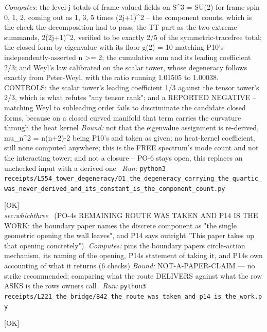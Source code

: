 \begin{description}
\emph{Computes:} the level-j totals of frame-valued fields on S\textasciicircum{}3 = SU(2) for frame-spin 0, 1, 2, coming out as 1, 3, 5 times (2j+1)\textasciicircum{}2 -- the component counts, which is the check the decomposition had to pass; the TT part as the two extreme summands, 2(2j+1)\textasciicircum{}2, verified to be exactly 2/5 of the symmetric-tracefree total; the closed form by eigenvalue with its floor g(2) = 10 matching P10's independently-asserted n >= 2; the cumulative sum and its leading coefficient 2/3; and Weyl's law calibrated on the scalar tower, whose degeneracy follows exactly from Peter-Weyl, with the ratio running 1.01505 to 1.00038. CONTROLS: the scalar tower's leading coefficient 1/3 against the tensor tower's 2/3, which is what refutes "any tensor rank"; and a REPORTED NEGATIVE -- matching Weyl to subleading order fails to discriminate the candidate closed forms, because on a closed curved manifold that term carries the curvature through the heat kernel
 \emph{Bound:} not that the eigenvalue assignment is re-derived, mu\_n\textasciicircum{}2 = n(n+2)-2 being P10's and taken as given; no heat-kernel coefficient, still none computed anywhere; this is the FREE spectrum's mode count and not the interacting tower; and not a closure -- PO-6 stays open, this replaces an unchecked input with a derived one
\ \emph{Run:} \texttt{python3 receipts/L554\_tower\_degeneracy/D1\_the\_degeneracy\_carrying\_the\_quartic\_was\_never\_derived\_and\_its\_constant\_is\_the\_component\_count.py}
\item[\label{rcpt:B42_the_route_was_taken_and_p14_is_the_work}\texttt{B42\_the\_route\_was\_taken\_and\_p14\_is\_the\_work}]\hfill\textsf{[OK]}\\
\textit{sec:whichthree} \ (PO-4s REMAINING ROUTE WAS TAKEN AND P14 IS THE WORK: the boundary paper names the discrete component as "the single geometric opening the wall leaves", and P14 says outright "This paper takes up that opening concretely"). 
\emph{Computes:} pins the boundary papers circle-action mechanism, its naming of the opening, P14s statement of taking it, and P14s own accounting of what it returns (6 checks)
 \emph{Bound:} NOT-A-PAPER-CLAIM --- no strike recommended; comparing what the route DELIVERS against what the row ASKS is the rows owners call
\ \emph{Run:} \texttt{python3 receipts/L221\_the\_bridge/B42\_the\_route\_was\_taken\_and\_p14\_is\_the\_work.py}
\item[\label{rcpt:C53_the_k_range_fixes_one_arm_only}\texttt{C53\_the\_k\_range\_fixes\_one\_arm\_only}]\hfill\textsf{[OK]}\\

\end{description}
